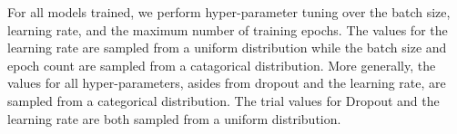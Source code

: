 %
For all models trained, we perform hyper-parameter tuning over the batch size, learning rate, and the maximum number of training epochs. The values for the learning rate are sampled from a uniform distribution while the batch size and epoch count are sampled from a catagorical distribution. More generally, the values for all hyper-parameters, asides from dropout and the learning rate, are sampled from a categorical distribution. The trial values for Dropout and the learning rate are both sampled from a uniform distribution.

